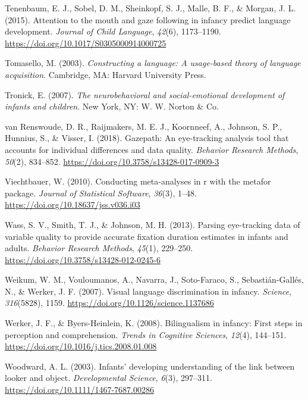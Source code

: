 \documentclass[english,,man,floatsintext]{apa6}
\begin{document}
\leavevmode\hypertarget{ref-Tenenbaum_etal_2015}{}%
Tenenbaum, E. J., Sobel, D. M., Sheinkopf, S. J., Malle, B. F., \& Morgan, J. L. (2015). Attention to the mouth and gaze following in infancy predict language development. \emph{Journal of Child Language}, \emph{42}(6), 1173--1190. \url{https://doi.org/10.1017/S0305000914000725}

\leavevmode\hypertarget{ref-Tomasello_2003}{}%
Tomasello, M. (2003). \emph{Constructing a language: A usage-based theory of language acquisition}. Cambridge, MA: Harvard University Press.

\leavevmode\hypertarget{ref-Tronick_2007}{}%
Tronick, E. (2007). \emph{The neurobehavioral and social-emotional development of infants and children}. New York, NY: W. W. Norton \& Co.

\leavevmode\hypertarget{ref-vanRenswoude_etal_2018}{}%
van Renswoude, D. R., Raijmakers, M. E. J., Koornneef, A., Johnson, S. P., Hunnius, S., \& Visser, I. (2018). Gazepath: An eye-tracking analysis tool that accounts for individual differences and data quality. \emph{Behavior Research Methods}, \emph{50}(2), 834--852. \url{https://doi.org/10.3758/s13428-017-0909-3}

\leavevmode\hypertarget{ref-Viechtbauer_2010}{}%
Viechtbauer, W. (2010). Conducting meta-analyses in r with the metafor package. \emph{Journal of Statistical Software}, \emph{36}(3), 1--48. \url{https://doi.org/10.18637/jss.v036.i03}

\leavevmode\hypertarget{ref-Wass_etal_2013}{}%
Wass, S. V., Smith, T. J., \& Johnson, M. H. (2013). Parsing eye-tracking data of variable quality to provide accurate fixation duration estimates in infants and adults. \emph{Behavior Research Methods}, \emph{45}(1), 229--250. \url{https://doi.org/10.3758/s13428-012-0245-6}

\leavevmode\hypertarget{ref-Weikum_etal_2007}{}%
Weikum, W. M., Vouloumanos, A., Navarra, J., Soto-Faraco, S., Sebastián-Gallés, N., \& Werker, J. F. (2007). Visual language discrimination in infancy. \emph{Science}, \emph{316}(5828), 1159. \url{https://doi.org/10.1126/science.1137686}

\leavevmode\hypertarget{ref-Werker_Byers-Heinlein_2008}{}%
Werker, J. F., \& Byers-Heinlein, K. (2008). Bilingualism in infancy: First steps in perception and comprehension. \emph{Trends in Cognitive Sciences}, \emph{12}(4), 144--151. \url{https://doi.org/10.1016/j.tics.2008.01.008}

\leavevmode\hypertarget{ref-Woodward_2003}{}%
Woodward, A. L. (2003). Infants' developing understanding of the link between looker and object. \emph{Developmental Science}, \emph{6}(3), 297--311. \url{https://doi.org/10.1111/1467-7687.00286}
\end{document}
